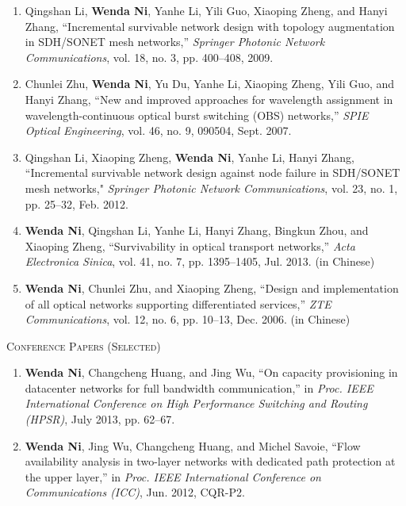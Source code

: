 \documentclass[letterpaper,11pt]{article}
\newcommand{\resheading}[1]{{\noindent\large \colorbox{mygrey}{
\begin{minipage}{1.0\textwidth}{\textsc{#1 \vphantom{p\^{E}}}}\end{minipage}}}}
\begin{document}
\begin{CJK}{UTF8}{gbsn}
\begin{enumerate}
\item
Qingshan Li, \textbf{Wenda Ni}, Yanhe Li, Yili Guo, Xiaoping Zheng, and Hanyi Zhang, ``Incremental survivable network design with topology augmentation in SDH/SONET mesh networks,'' \textit{Springer Photonic Network Communications}, vol. 18, no. 3, pp. 400--408,
2009.

\item
Chunlei Zhu, \textbf{Wenda Ni}, Yu Du, Yanhe Li, Xiaoping Zheng, Yili Guo, and Hanyi Zhang, ``New and improved approaches for wavelength assignment in wavelength-continuous optical burst switching (OBS) networks,'' \textit{SPIE Optical Engineering}, vol. 46, no. 9, 090504, Sept. 2007.

\item
Qingshan Li, Xiaoping Zheng, \textbf{Wenda Ni}, Yanhe Li, Hanyi Zhang, ``Incremental survivable network design against node failure in SDH/SONET mesh networks," \textit{Springer Photonic Network Communications}, vol. 23, no. 1, pp. 25--32, Feb. 2012.

\item
\textbf{Wenda Ni}, Qingshan Li, Yanhe Li, Hanyi Zhang, Bingkun Zhou, and Xiaoping Zheng, ``Survivability in optical transport networks,'' \textit{Acta Electronica Sinica}, vol. 41, no. 7, pp. 1395--1405, Jul. 2013. (in Chinese)

\item
\textbf{Wenda Ni}, Chunlei Zhu, and Xiaoping Zheng, ``Design and implementation of all optical networks supporting differentiated services,'' \textit{ZTE Communications}, vol. 12, no. 6, pp. 10--13, Dec. 2006. (in Chinese)
\end{enumerate}




\resheading{Conference Papers (Selected)}%

\begin{enumerate}
\item
\textbf{Wenda Ni}, Changcheng Huang, and Jing Wu, ``On capacity provisioning in datacenter networks for full bandwidth communication,'' in \textit{Proc. IEEE International Conference on High Performance Switching and Routing (HPSR)}, July 2013, pp. 62--67.

\item
\textbf{Wenda Ni}, Jing Wu, Changcheng Huang, and Michel Savoie, ``Flow availability analysis in two-layer networks with dedicated path protection at the upper layer,'' in \textit{Proc. IEEE International Conference on Communications (ICC)}, Jun. 2012, CQR-P2.


\end{enumerate}
\end{CJK}
\end{document}
